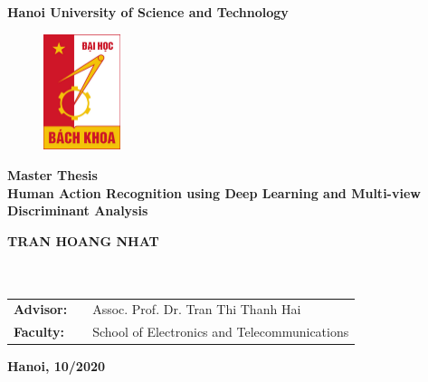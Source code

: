 
\begin{titlepage}
\thispagestyle{empty}
\begin{center}
\textbf{\large{Hanoi University of Science and Technology}} \\

\vspace{0.2cm}

\begin{figure}[htbp]
    \begin{center}
    \includegraphics[width=0.2\textwidth]{figs/hust-logo.jpg}
    \end{center}
\end{figure}

\vspace{0.5cm}

\textbf{\Huge{Master Thesis}} \\
\vspace{1.2cm}
\textbf{\LARGE{Human Action Recognition using Deep Learning and Multi-view Discriminant Analysis}} \\

\vspace{1.0cm}

\textbf{\large{TRAN HOANG NHAT}} \\
\small{\emailofauthor} \\
\vspace{0.3cm}
\textbf{\large{\majorofauthor}} \\
\vspace{2.5cm}

\small
\renewcommand{\arraystretch}{1.5} 
\begin{tabular}{lll}
    \textbf{Advisor:} & & Assoc. Prof. Dr. Tran Thi Thanh Hai \\
    \textbf{Faculty:} & & School of Electronics and Telecommunications \\
\end{tabular}

\vspace{\fill}
\textbf{\normalsize{Hanoi, 10/2020}}
\end{center}
\end{titlepage}
